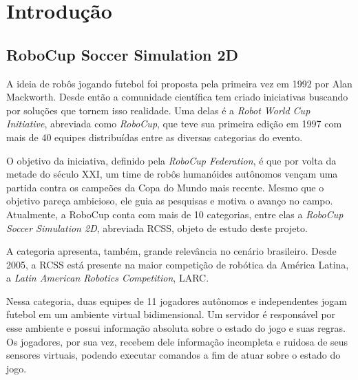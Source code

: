 
\chapter{Introdução}

\label{CapIntro}



\section{RoboCup Soccer Simulation 2D}
\par A ideia de robôs jogando futebol foi proposta pela primeira vez em 1992 por Alan Mackworth\cite{mackworth1993seeing}.
Desde então a comunidade científica tem criado iniciativas buscando por soluções que tornem isso realidade.
Uma delas é a \textit{Robot World Cup Initiative}, abreviada como \textit{RoboCup}, que teve sua primeira edição em 1997 com mais de 40 equipes distribuídas entre as diversas categorias do evento. 
\par O objetivo da iniciativa, definido pela \textit{RoboCup Federation}, é que por volta da metade do século XXI, um time de robôs humanóides autônomos vençam uma partida contra os campeões da Copa do Mundo mais recente. Mesmo que o objetivo pareça ambicioso, ele guia as pesquisas e motiva o avanço no campo.
Atualmente, a RoboCup conta com mais de 10 categorias, entre elas a \textit{RoboCup Soccer Simulation 2D}, abreviada RCSS, objeto de estudo deste projeto.
\par A categoria apresenta, também, grande relevância no cenário brasileiro.
Desde 2005, a RCSS está presente na maior competição de robótica da América Latina, a \textit{Latin American Robotics Competition}, LARC.
\par Nessa categoria, duas equipes de 11 jogadores autônomos e independentes jogam futebol em um ambiente virtual bidimensional.
Um servidor é responsável por esse ambiente e possui informação absoluta sobre o estado do jogo e suas regras.
Os jogadores, por sua vez, recebem dele informação incompleta e ruidosa de seus sensores virtuais, podendo executar comandos a fim de atuar sobre o estado do jogo.

